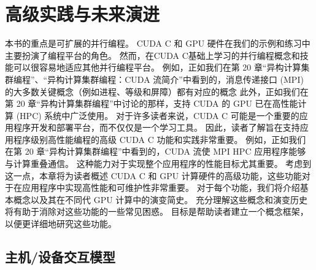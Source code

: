 \section{高级实践与未来演进}
本书的重点是可扩展的并行编程。 CUDA C 和 GPU 硬件在我们的示例和练习中主要扮演了编程平台的角色。 然而，在CUDA C基础上学习的并行编程概念和技能可以很容易地适应其他并行编程平台。 例如，正如我们在第 20 章“异构计算集群编程”、“异构计算集群编程：CUDA 流简介”中看到的，消息传递接口 (MPI) 的大多数关键概念（例如进程、等级和屏障）都有对应的概念 此外，正如我们在第 20 章“异构计算集群编程”中讨论的那样，支持 CUDA 的 GPU 已在高性能计算 (HPC) 系统中广泛使用。 对于许多读者来说，CUDA C 可能是一个重要的应用程序开发和部署平台，而不仅仅是一个学习工具。 因此，读者了解旨在支持应用程序级别高性能编程的高级 CUDA C 功能和实践非常重要。 例如，正如我们在第 20 章“异构计算集群编程”中看到的，CUDA 流使 MPI HPC 应用程序能够与计算重叠通信。 这种能力对于实现整个应用程序的性能目标尤其重要。 考虑到这一点，本章将为读者概述 CUDA C 和 GPU 计算硬件的高级功能，这些功能对于在应用程序中实现高性能和可维护性非常重要。 对于每个功能，我们将介绍基本概念以及其在不同代 GPU 计算中的演变简史。 充分理解这些概念和演变历史将有助于消除对这些功能的一些常见困惑。 目标是帮助读者建立一个概念框架，以便更详细地研究这些功能。

\subsection{主机/设备交互模型}